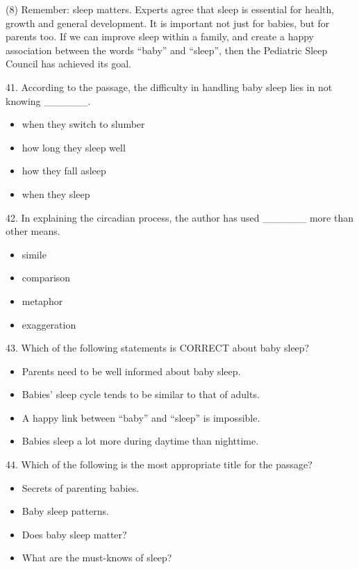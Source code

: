 \documentclass[UTF8,11pt]{ctexart}
\begin{document}
(8) Remember: sleep matters. Experts agree that sleep is essential for health, growth and general development. It is important not just for babies, but for parents too. If we can improve sleep within a family, and create a happy association between the words “baby” and “sleep”, then the Pediatric Sleep Council has achieved its goal.


41. According to the passage, the difficulty in handling baby sleep lies in not knowing \_\_\_\_\_\_.


\begin{itemize}[leftmargin=2em,itemsep=.2em,topsep=.4em]\item[A.] when they switch to slumber
\item[B.] how long they sleep well
\item[C.] how they fall asleep
\item[D.] when they sleep
\end{itemize}

42. In explaining the circadian process, the author has used \_\_\_\_\_\_ more than other means.


\begin{itemize}[leftmargin=2em,itemsep=.2em,topsep=.4em]\item[A.] simile
\item[B.] comparison
\item[C.] metaphor
\item[D.] exaggeration
\end{itemize}

43. Which of the following statements is CORRECT about baby sleep?


\begin{itemize}[leftmargin=2em,itemsep=.2em,topsep=.4em]\item[A.] Parents need to be well informed about baby sleep.
\item[B.] Babies’ sleep cycle tends to be similar to that of adults.
\item[C.] A happy link between “baby” and “sleep” is impossible.
\item[D.] Babies sleep a lot more during daytime than nighttime.
\end{itemize}

44. Which of the following is the most appropriate title for the passage?


\begin{itemize}[leftmargin=2em,itemsep=.2em,topsep=.4em]\item[A.] Secrets of parenting babies.
\item[B.] Baby sleep patterns.
\item[C.] Does baby sleep matter?
\item[D.] What are the must-knows of sleep?
\end{itemize}
\end{document}
